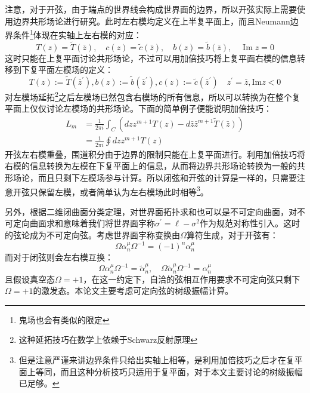 注意，对于开弦，由于端点的世界线会构成世界面的边界，所以开弦实际上需要使用边界共形场论进行研究。此时左右模均定义在上半复平面上，而且Neumann边界条件\footnote{鬼场也会有类似的限定}体现在实轴上左右模的对应：
\begin{equation}
	T(z)=\tilde{T}(\bar{z}),\quad c(z)=\tilde{c}(\bar{z}),\quad b(z)=\tilde{b}(\bar{z}),\quad\operatorname{Im}z=0
\end{equation}
这时只能在上复平面讨论共形场论，不过可以用加倍技巧将上复平面右模的信息转移到下复平面左模场的定义：
\begin{equation}
	\label{eq:2.35}
	T(z):= \tilde T(\bar{z}^{\prime}),b(z):= \tilde b(\bar{z}^{\prime}),c(z):= \tilde c(\bar{z}^{\prime})\quad z^\prime = \bar z,\mathrm{Im}z<0
\end{equation}
对左模场延拓\footnote{这种延拓技巧在数学上依赖于Schwarz反射原理}之后左模场已然包含右模场的所有信息，所以可以转换为在整个复平面上仅仅讨论左模场的共形场论。下面的简单例子便能说明加倍技巧：
\begin{equation}
	\begin{aligned}
		L_m&=\frac{1}{2\pi i}\int_C\left(dzz^{m+1}T(z)-d\bar{z}\bar{z}^{m+1}\tilde{T}(\bar z)\right)
		\\&=\frac{1}{2\pi i}\oint dzz^{m+1}T(z)
	\end{aligned}
\end{equation}
开弦左右模重叠，围道积分由于边界的限制只能在上复平面进行。利用加倍技巧将右模的信息转换为左模在下复平面上的信息，从而将边界共形场论转换为一般的共形场论，而且只剩下左模场参与计算。所以闭弦和开弦的计算是一样的，只需要注意开弦只保留左模，或者简单认为左右模场此时相等\footnote{但是注意严谨来讲边界条件只给出实轴上相等，是利用加倍技巧之后才在复平面上等同，而且这种分析技巧只适用于复平面，对于本文主要讨论的树级振幅已足够。}。

另外，根据二维闭曲面分类定理，对世界面拓扑求和也可以是不可定向曲面，对不可定向曲面求和意味着我们将世界面宇称$\sigma^{\prime}=\ell-\sigma^2$作为规范对称性引入。这时的弦论成为不可定向弦。考虑世界面宇称变换由$\Omega$算符生成，对于开弦有：
\begin{equation}
	\Omega\alpha_n^\mu\Omega^{-1}=(-1)^n\alpha_n^\mu
\end{equation}
而对于闭弦则会左右模互换：
\begin{equation}
	\Omega\alpha_n^\mu\Omega^{-1}=\tilde\alpha_n^\mu,\quad \Omega\tilde\alpha_n^\mu\Omega^{-1}=\alpha_n^\mu
\end{equation}
且假设真空态$\Omega=+1$，在这一约定下，自洽的弦相互作用要求不可定向弦只剩下$\Omega=+1$的激发态。本论文主要考虑可定向弦的树级振幅计算。
